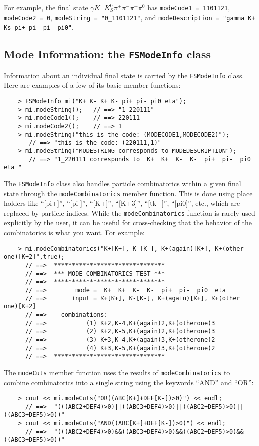 \documentclass[11pt]{article}
\begin{document}
For example, the final state $\gamma K^+ K^0_S \pi^+ \pi^- \pi^- \pi^0$ has {\tt modeCode1 = 1101121}, {\tt modeCode2 = 0}, {\tt modeString = "0\_1101121"}, and {\tt modeDescription = "gamma K+ Ks pi+ pi- pi- pi0"}. 

\subsection{Mode Information: the {\tt FSModeInfo} class}
\label{sec:modeinfo}

Information about an individual final state is carried by the {\tt FSModeInfo} class.  Here are examples of a few of its basic member functions:
\begin{verbatim}
    > FSModeInfo mi("K+ K- K+ K- pi+ pi- pi0 eta");
    > mi.modeString();   // ==> "1_220111"
    > mi.modeCode1();    // ==> 220111
    > mi.modeCode2();    // ==> 1
    > mi.modeString("this is the code: (MODECODE1,MODECODE2)");
       // ==> "this is the code: (220111,1)" 
    > mi.modeString("MODESTRING corresponds to MODEDESCRIPTION");
       // ==> "1_220111 corresponds to  K+  K+  K-  K-  pi+  pi-  pi0  eta "
\end{verbatim}

The {\tt FSModeInfo} class also handles particle combinatorics within a given final state through the {\tt modeCombinatorics} member function.  This is done using place holders like ``[pi+]'', ``[pi-]'', ``[K+]'', ``[K+3]'', ``[tk+]'', ``[pi0]'', etc., which are replaced by particle indices.  While the {\tt modeCombinatorics} function is rarely used explicitly by the user, it can be useful for cross-checking that the behavior of the combinatorics is what you want. For example:
\begin{verbatim}
    > mi.modeCombinatorics("K+[K+], K-[K-], K+(again)[K+], K+(other one)[K+2]",true);
      // ==>  *******************************
      // ==>  *** MODE COMBINATORICS TEST ***
      // ==>  *******************************
      // ==>        mode =  K+  K+  K-  K-  pi+  pi-  pi0  eta 
      // ==>       input = K+[K+], K-[K-], K+(again)[K+], K+(other one)[K+2]
      // ==>    combinations:
      // ==>           (1) K+2,K-4,K+(again)2,K+(otherone)3
      // ==>           (2) K+2,K-5,K+(again)2,K+(otherone)3
      // ==>           (3) K+3,K-4,K+(again)3,K+(otherone)2
      // ==>           (4) K+3,K-5,K+(again)3,K+(otherone)2
      // ==>  *******************************
\end{verbatim}

The {\tt modeCuts} member function uses the results of {\tt modeCombinatorics} to combine combinatorics into a single string using the keywords ``AND'' and ``OR'':
\begin{verbatim}
    > cout << mi.modeCuts("OR((ABC[K+]+DEF[K-])>0)") << endl;
      // ==>  "(((ABC2+DEF4)>0)||((ABC3+DEF4)>0)||((ABC2+DEF5)>0)||((ABC3+DEF5)>0))"
    > cout << mi.modeCuts("AND((ABC[K+]+DEF[K-])>0)") << endl;
      // ==>  "(((ABC2+DEF4)>0)&&((ABC3+DEF4)>0)&&((ABC2+DEF5)>0)&&((ABC3+DEF5)>0))"
\end{verbatim}
\end{document}
